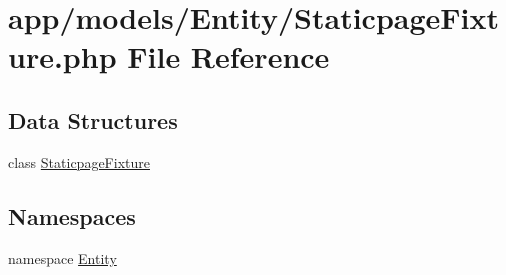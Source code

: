 \hypertarget{_staticpage_fixture_8php}{\section{app/models/\-Entity/\-Staticpage\-Fixture.php File Reference}
\label{_staticpage_fixture_8php}
}
\subsection*{Data Structures}
\begin{DoxyCompactItemize}
\item 
class \hyperlink{class_entity_1_1_staticpage_fixture}{Staticpage\-Fixture}
\end{DoxyCompactItemize}
\subsection*{Namespaces}
\begin{DoxyCompactItemize}
\item 
namespace \hyperlink{namespace_entity}{Entity}
\end{DoxyCompactItemize}
